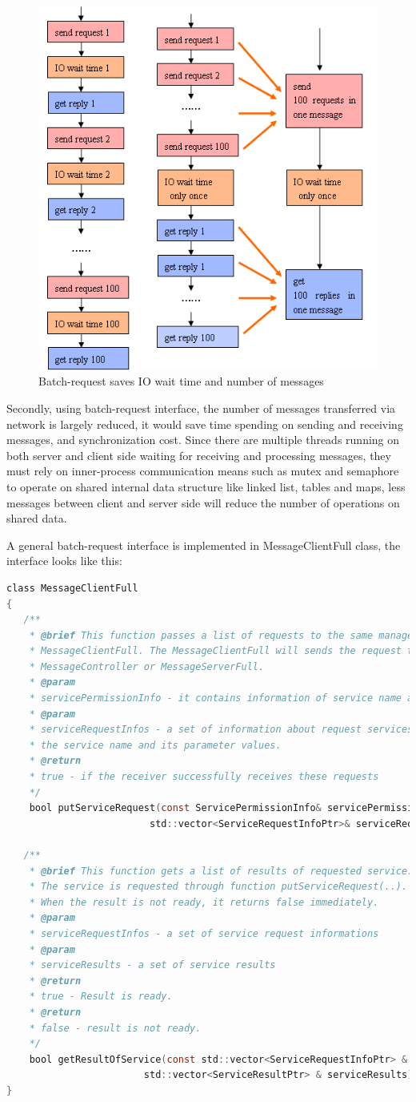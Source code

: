 \documentclass[a4paper,10pt]{article}
\begin{document}
\begin{figure}[!ht]\centering
  \includegraphics[width=.50\textwidth]{op_2.png}
  \caption{Batch-request saves IO wait time and number of messages}\label{fig:op_2}
\end{figure}

Secondly, using batch-request interface, the number of messages transferred via network is largely reduced, it would save time spending on sending and receiving messages, and synchronization cost.
Since there are multiple threads running on both server and client side waiting for receiving and processing messages,
they must rely on inner-process communication means such as mutex and semaphore to operate on shared internal data structure like linked list, tables and maps,
less messages between client and server side will reduce the number of operations on shared data.

A general batch-request interface is implemented in MessageClientFull class, the interface looks like this:

\begin{lstlisting}[language=C]
class MessageClientFull
{
   /**
    * @brief This function passes a list of requests to the same manager on to
    * MessageClientFull. The MessageClientFull will sends the request to either
    * MessageController or MessageServerFull.
    * @param
    * servicePermissionInfo - it contains information of service name and the server
    * @param
    * serviceRequestInfos - a set of information about request services, each contains
    * the service name and its parameter values.
    * @return
    * true - if the receiver successfully receives these requests
    */
    bool putServiceRequest(const ServicePermissionInfo& servicePermissionInfo,
                         std::vector<ServiceRequestInfoPtr>& serviceRequestInfos);

   /**
    * @brief This function gets a list of results of requested service.
    * The service is requested through function putServiceRequest(..).
    * When the result is not ready, it returns false immediately.
    * @param
    * serviceRequestInfos - a set of service request informations
    * @param
    * serviceResults - a set of service results
    * @return
    * true - Result is ready.
    * @return
    * false - result is not ready.
    */
    bool getResultOfService(const std::vector<ServiceRequestInfoPtr> & serviceRequestInfo,
                        std::vector<ServiceResultPtr> & serviceResults);
}
\end{lstlisting}
\end{document}
